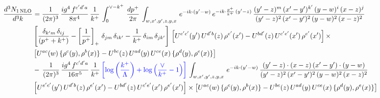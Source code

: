 \documentclass[9pt]{article}
\numberwithin{equation}{section}
\begin{document}
\begin{align}
     \frac{d^{3}N_{1\,\rm NLO}}{d^{3}k} & = \frac{1}{(2\pi)^{3}}\, \frac{ig^{4}\,f^{c'd'a}}{8\pi^{4}}\, \frac{1}{k^{+}}\,\int_{0}^{\vee-k^{+}}\,  \frac{dp^{+}}{2\pi}\, \int_{w,x',y',z,y,x}\, e^{-ik\cdot (y'-w)}\, e^{-ik\cdot \frac{p^{+}}{k^{+}}\,(y'-z)}\,\frac{(y'-z)^{m}\,(x'-y')^{k'}\,(y-w)^{i}\,(x-z)^{j}}{(y'-z)^{2}\,(x'-y')^{2}\,(y-w)^{2}\,(x-z)^{2}}\notag \\ & \left[\frac{\delta_{k'm}\,\delta_{ij}}{(p^{+}+k^{+})}-\left[\frac{1}{p^{+}}\right]_{+}\,\delta_{jm}\,\delta_{ik'}-\frac{1}{k^{+}}\, \delta_{im}\, \delta_{jk'}\right]\, \left[U^{e'c'}(y')\,U^{d'b}(z)\,\rho^{e'}(x')-U^{bd'}(z)\,U^{c'e'}(x')\,\rho^{e'}(x')\right]\times\notag \\ &  \left[U^{ac}(w)\, \{\rho^{c}(y),\rho^{b}(x)\}-U^{bc}(z)\,U^{ad}(y)\,U^{ce}(x)\,\{\rho^{d}(y),\rho^{e}(x)\}\right]\notag \\ & -\,\frac{1}{(2\pi)^{3}}\, \frac{ig^{4}\,f^{c'd'a}}{16\pi^{5}}\, \frac{1}{k^{+}}\,{\color{blue}\left[\log{\left(\frac{k^{+}}{\Lambda}\right)}+\log{\left(\frac{\vee}{k^{+}}-1\right)}\right]}\, \int_{w,x',y',z,y,x}\, e^{-ik\cdot (y'-w)}\,\frac{(y'-z)\cdot (x-z)\,(x'-y')\cdot (y-w)}{(y'-z)^{2}\,(x'-y')^{2}\,(y-w)^{2}\,(x-z)^{2}}\notag \\ &  \left[U^{e'c'}(y')\,U^{d'b}(z)\,\rho^{e'}(x')-U^{bd'}(z)\,U^{c'e'}(x')\,\rho^{e'}(x')\right]\times  \left[U^{ac}(w)\, \{\rho^{c}(y),\rho^{b}(x)\}-U^{bc}(z)\,U^{ad}(y)\,U^{ce}(x)\,\{\rho^{d}(y),\rho^{e}(x)\}\right]
\end{align} 
\end{document}
